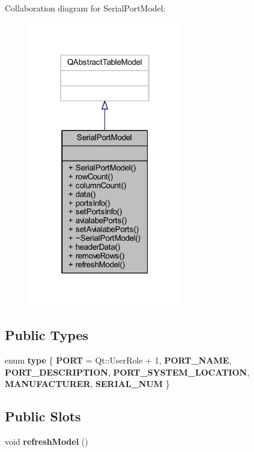 Collaboration diagram for Serial\+Port\+Model\+:\nopagebreak
\begin{figure}[H]
\begin{center}
\leavevmode
\includegraphics[width=190pt]{d2/d28/class_serial_port_model__coll__graph}
\end{center}
\end{figure}
\subsection*{Public Types}
\begin{DoxyCompactItemize}
\item 
\mbox{\label{class_serial_port_model_ad6ab79d19e1677e88f36e77f75b5c497}} 
enum {\bfseries type} \{ \newline
{\bfseries P\+O\+RT} = Qt\+:\+:User\+Role + 1, 
{\bfseries P\+O\+R\+T\+\_\+\+N\+A\+ME}, 
{\bfseries P\+O\+R\+T\+\_\+\+D\+E\+S\+C\+R\+I\+P\+T\+I\+ON}, 
{\bfseries P\+O\+R\+T\+\_\+\+S\+Y\+S\+T\+E\+M\+\_\+\+L\+O\+C\+A\+T\+I\+ON}, 
\newline
{\bfseries M\+A\+N\+U\+F\+A\+C\+T\+U\+R\+ER}, 
{\bfseries S\+E\+R\+I\+A\+L\+\_\+\+N\+UM}
 \}
\end{DoxyCompactItemize}
\subsection*{Public Slots}
\begin{DoxyCompactItemize}
\item 
\mbox{\label{class_serial_port_model_ac6fd51a5d5c23815a21b7c38b82e3980}} 
void {\bfseries refresh\+Model} ()
\end{DoxyCompactItemize}
